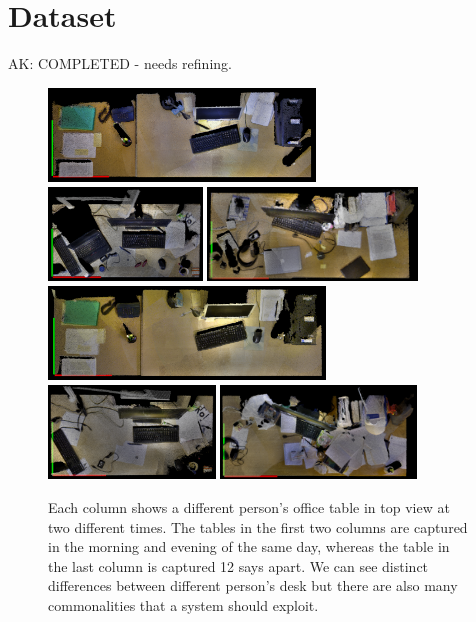 \documentclass[letterpaper, 10 pt, conference]{ieeeconf}  %
\begin{document}
\section{Dataset}
\label{sec:Dataset}


{\color{blue} AK: COMPLETED - needs refining.}

\begin{figure}
\begin{center}
\includegraphics[height=2.5cm]{David_Mor_131110} \quad
\includegraphics[height=2.5cm]{Nils_Mor_131111} \quad
\includegraphics[height=2.5cm]{Puren_Eve_131029}\\ \smallskip
\includegraphics[height=2.5cm]{David_Eve_131110} \enskip
\includegraphics[height=2.5cm]{Nils_Eve_131111} \enskip
\includegraphics[height=2.5cm]{Puren_Mor_131110}
\caption{Each column shows a different person's office table in top view at two different times. The tables in the first two columns are captured in the morning and evening of the same day, whereas the table in the last column is captured 12 says apart. We can see distinct differences between different person's desk but there are also many commonalities that a system should exploit. }
\label{fig:Example Scenes}
\end{center}
\end{figure}
\end{document}
